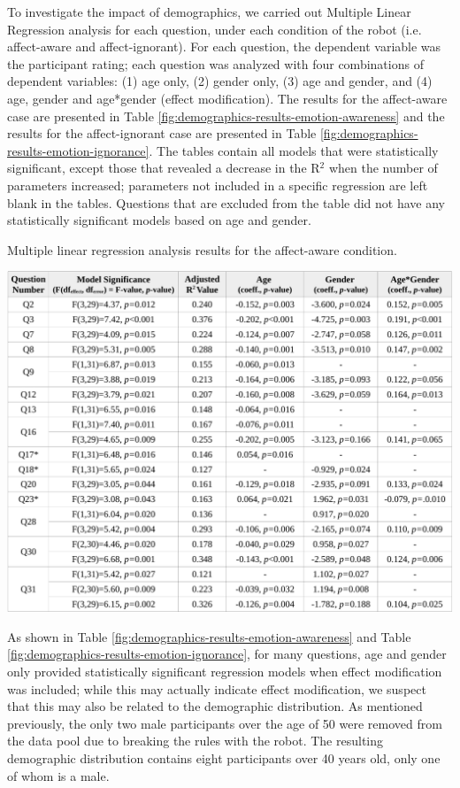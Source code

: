 \documentclass[12pt]{report}
\begin{document}
To investigate the impact of demographics, we carried out Multiple Linear
Regression analysis for each question, under each condition of the robot (i.e.
affect-aware and affect-ignorant). For each question, the dependent variable
was the participant rating; each question was analyzed with four combinations of
dependent variables: (1) age only, (2) gender only, (3) age and gender, and (4)
age, gender and age*gender (effect modification). The results for the
affect-aware case are presented in Table
\ref{fig:demographics-results-emotion-awareness} and the results for the
affect-ignorant case are presented in Table
\ref{fig:demographics-results-emotion-ignorance}. The tables contain all models
that were statistically significant, except those that revealed a decrease in
the R$^2$ when the number of parameters increased; parameters not included in a
specific regression are left blank in the tables. Questions that are excluded
from the table did not have any statistically significant models based on age
and gender.

\begin{table}[t]
  \centering
  \caption{Multiple linear regression analysis results for the affect-aware
  condition.}
  \label{fig:demographics-results-emotion-awareness}
  \vspace*{-3mm}
  \includegraphics[width=1\textwidth]{figure/demographics-results-emotion-awareness-croped.pdf}
\end{table}

As shown in Table \ref{fig:demographics-results-emotion-awareness} and Table
\ref{fig:demographics-results-emotion-ignorance}, for many questions, age and
gender only provided statistically significant regression models when effect
modification was included; while this may actually indicate effect modification,
we suspect that this may also be related to the demographic distribution. As
mentioned previously, the only two male participants over the age of 50 were
removed from the data pool due to breaking the rules with the robot. The
resulting demographic distribution contains eight participants over 40 years
old, only one of whom is a male.
\end{document}
